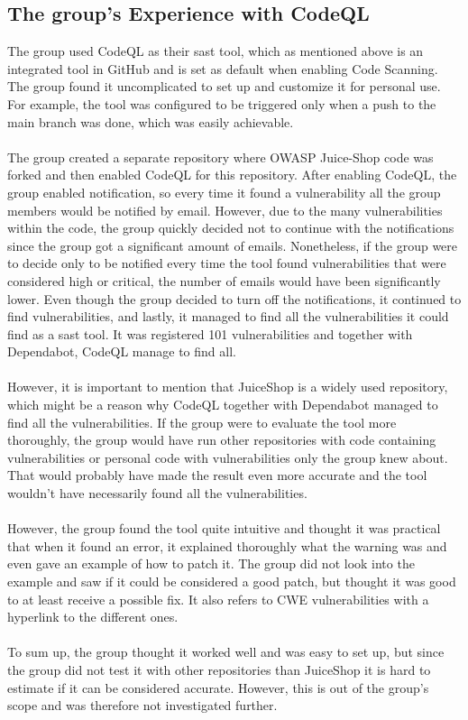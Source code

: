 \subsection{The group's Experience with CodeQL}
The group used CodeQL as their \acrshort{sast} tool, which as mentioned above is an integrated tool in GitHub and is set as default when enabling Code Scanning. The group found it uncomplicated to set up and customize it for personal use. For example, the tool was configured to be triggered only when a push to the main branch was done, which was easily achievable. 
\\~\\
The group created a separate repository where OWASP Juice-Shop code was forked and then enabled CodeQL for this repository. After enabling CodeQL, the group enabled notification, so every time it found a vulnerability all the group members would be notified by email. However, due to the many vulnerabilities within the code, the group quickly decided not to continue with the notifications since the group got a significant amount of emails. Nonetheless, if the group were to decide only to be notified every time the tool found vulnerabilities that were considered high or critical, the number of emails would have been significantly lower. Even though the group decided to turn off the notifications, it continued to find vulnerabilities, and lastly, it managed to find all the vulnerabilities it could find as a \acrshort{sast} tool. It was registered 101 vulnerabilities and together with Dependabot, CodeQL manage to find all.  
\\~\\
However, it is important to mention that JuiceShop is a widely used repository, which might be a reason why CodeQL together with Dependabot managed to find all the vulnerabilities. If the group were to evaluate the tool more thoroughly, the group would have run other repositories with code containing vulnerabilities or personal code with vulnerabilities only the group knew about. That would probably have made the result even more accurate and the tool wouldn't have necessarily found all the vulnerabilities. 
\\~\\
However, the group found the tool quite intuitive and thought it was practical that when it found an error, it explained thoroughly what the warning was and even gave an example of how to patch it. The group did not look into the example and saw if it could be considered a good patch, but thought it was good to at least receive a possible fix. It also refers to CWE vulnerabilities with a hyperlink to the different ones. 
\\~\\
To sum up, the group thought it worked well and was easy to set up, but since the group did not test it with other repositories than JuiceShop it is hard to estimate if it can be considered accurate. However, this is out of the group's scope and was therefore not investigated further. 



